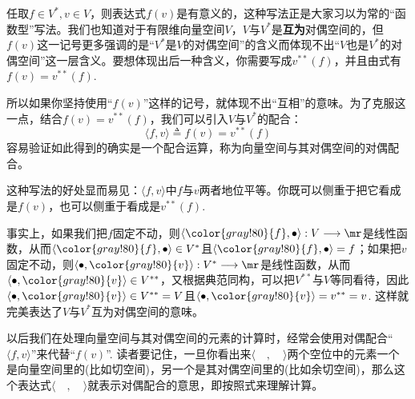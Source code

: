 \begin{example}[对偶配合]
	\label{chapter2对偶空间的配合}
	任取$f\in V^{\ast},v\in V$，则表达式$f(v)$是有意义的，这种写法正是大家习以为常的“函数型”写法。我们也知道对于有限维向量空间$V$，$V$与$V^{\ast}$是\textbf{互为}对偶空间的，但$f(v)$这一记号更多强调的是“$V^{\ast}$是$V$的对偶空间”的含义而体现不出“$V$也是$V^{\ast}$的对偶空间”这一层含义。要想体现出后一种含义，你需要写成$v^{\ast\ast}(f)$，并且由式有$f(v)=v^{\ast\ast}(f)$.

	所以如果你坚持使用“$f(v)$”这样的记号，就体现不出“互相”的意味。为了克服这一点，结合$f(v)=v^{\ast\ast}(f)$，我们可以引入$V$与$V^{\ast}$的配合：
	\begin{equation}
	\langle f,v \rangle\triangleq f(v)=v^{\ast\ast}(f)
	\label{对偶空间的配合运算}
	\end{equation}
	容易验证如此得到的确实是一个配合运算，称为向量空间与其对偶空间的对偶配合。
\soln
 
这种写法的好处显而易见：$\langle f,v \rangle$中$f$与$v$两者地位平等。你既可以侧重于把它看成是$f(v)$，也可以侧重于看成是$v^{\ast\ast}(f)$. 

事实上，如果我们把$f$固定不动，则$\langle {\color{gray!80}{f}},\bullet \rangle:V\longrightarrow \mr$是线性函数，从而$\langle {\color{gray!80}{f}},\bullet\rangle\in V^{\ast}$且$\langle {\color{gray!80}{f}},\bullet\rangle=f$；如果把$v$固定不动，则$\langle \bullet,{\color{gray!80}{v}}\rangle: V^{\ast}\longrightarrow \mr$是线性函数，从而$\langle \bullet,{\color{gray!80}{v}}\rangle\in V^{\ast\ast}$，又根据典范同构，可以把$V^{\ast\ast}$与$V$等同看待，因此$\langle \bullet ,{\color{gray!80}{v}}\rangle\in V^{\ast\ast}=V$且$\langle \bullet ,{\color{gray!80}{v}}\rangle=v^{\ast\ast}=v$. 这样就完美表达了$V$与$V^{\ast}$互为对偶空间的意味。
\end{example}

以后我们在处理向量空间与其对偶空间的元素的计算时，经常会使用对偶配合“$\langle f,v\rangle$”来代替“$f(v)$”. 读者要记住，一旦你看出来$\langle \quad ,\quad\rangle$两个空位中的元素一个是向量空间里的(比如切空间)，另一个是其对偶空间里的(比如余切空间)，那么这个表达式$\langle \quad ,\quad\rangle$就表示对偶配合的意思，即按照式来理解计算。

